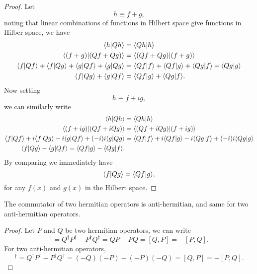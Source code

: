 \begin{proof}
Let
\begin{equation}
h\equiv f+g, 
\end{equation}
noting that linear combinations of functions in Hilbert space give functions in Hilber space, we have
\begin{subequations}
\begin{align}
\label{hermct1}
\langle h|Qh\rangle&=\langle Qh|h\rangle \\
\langle (f+g)|(Qf+Qg)\rangle&=\langle (Qf+Qg)|(f+g)\rangle \\
\langle f|Qf\rangle+\langle f|Qg\rangle+\langle g|Qf\rangle+\langle g|Qg\rangle&=\langle Qf|f\rangle+\langle Qf|g\rangle+\langle Qg|f\rangle+\langle Qg|g\rangle \\
\langle f|Qg\rangle+\langle g|Qf\rangle&=\langle Qf|g\rangle+\langle Qg|f\rangle. 
\end{align}
\end{subequations}
Now setting
\begin{equation}
h\equiv f+ig,
\end{equation}
we can similarly write
\begin{subequations}
\begin{align}
\label{hermct2}
\langle h|Qh\rangle&=\langle Qh|h\rangle \\
\langle (f+ig)|(Qf+iQg)\rangle&=\langle (Qf+iQg)|(f+ig)\rangle \\
\langle f|Qf\rangle+i\langle f|Qg\rangle-i\langle g|Qf\rangle+(-i)i \langle g|Qg\rangle&=\langle Qf|f\rangle+i \langle Qf|g\rangle-i \langle Qg|f\rangle+(-i)i \langle Qg|g\rangle \\
\langle f|Qg\rangle- \langle g|Qf\rangle=\langle Qf|g\rangle- \langle Qg|f\rangle.
\end{align}
\end{subequations}
By comparing  we immediately have
\begin{equation}
\langle f|Qg\rangle=\langle Qf|g\rangle,
\end{equation}
for any $f(x)$ and $g(x)$ in the Hilbert space. 
\end{proof}
\begin{thrm}
The commutator of two hermitian operators is anti-hermitian, and same for two anti-hermitian operators. 
\end{thrm}
\begin{proof}
Let $P$ and $Q$ be two hermitian operators, we can write
\begin{equation}
[P,Q]^{\dagger}=Q^{\dagger}P^{\dagger}-P^{\dagger}Q^{\dagger}=QP-PQ=[Q,P]=-[P,Q]. 
\end{equation}
For two anti-hermitian operators,
\begin{equation}
[P,Q]^{\dagger}=Q^{\dagger}P^{\dagger}-P^{\dagger}Q^{\dagger}=(-Q)(-P)-(-P)(-Q)=[Q,P]=-[P,Q]. 
\end{equation}
\end{proof}
